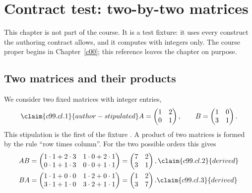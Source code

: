 %

\chapter{Contract test: two-by-two matrices}\label{c99}

This chapter is not part of the course. It is a test fixture: it uses every
construct the authoring contract allows, and it computes with integers only.
The course proper begins in Chapter~\ref{c00}; this reference leaves the chapter on
purpose.

\section{Two matrices and their products}\label{c99.s1}

We consider two fixed matrices with integer entries,
\begin{equation}\label{c99.eq.matrizen}\claim{c99.cl.1}{author-stipulated}
  A = \begin{pmatrix} 1 & 2 \\ 0 & 1 \end{pmatrix},
  \qquad
  B = \begin{pmatrix} 1 & 0 \\ 3 & 1 \end{pmatrix}.
\end{equation}
This stipulation is the first of the fixture .
A product of two matrices is formed by the rule “row times column”. For the two
possible orders this gives
\begin{align}
  AB &= \begin{pmatrix} 1\cdot 1 + 2\cdot 3 & 1\cdot 0 + 2\cdot 1 \\
                        0\cdot 1 + 1\cdot 3 & 0\cdot 0 + 1\cdot 1 \end{pmatrix}
      = \begin{pmatrix} 7 & 2 \\ 3 & 1 \end{pmatrix},
  \label{c99.eq.ab}\claim{c99.cl.2}{derived} \\
  BA &= \begin{pmatrix} 1\cdot 1 + 0\cdot 0 & 1\cdot 2 + 0\cdot 1 \\
                        3\cdot 1 + 1\cdot 0 & 3\cdot 2 + 1\cdot 1 \end{pmatrix}
      = \begin{pmatrix} 1 & 2 \\ 3 & 7 \end{pmatrix}.
  \label{c99.eq.ba}\claim{c99.cl.3}{derived}
\end{align}

